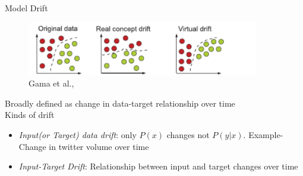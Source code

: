 

\begin{frame}{Model Drift}
\begin{figure}
    \centering
    \includegraphics[width=0.9\textwidth]{Problem1/figures/modelDrift.png}
    \caption{Gama et al.,~\cite{gama2014survey}}
\end{figure}
\vspace{-1em}
Broadly defined as change in data-target relationship over time \\
Kinds of drift
\begin{itemize}
    \item \textit{Input(or Target) data drift}: only $P(x)$ changes not $P(y|x)$. Example-Change in twitter volume over time
    \item \textit{Input-Target Drift}: Relationship between input and target changes over time
\end{itemize}
\end{frame}



